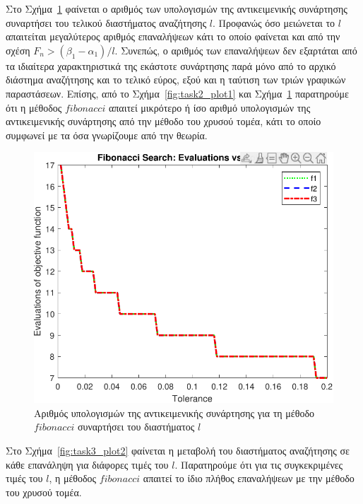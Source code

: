 \documentclass{article}
\begin{document}
Στο Σχήμα~\ref{fig:task3_plot1} φαίνεται ο αριθμός των υπολογισμών της αντικειμενικής συνάρτησης συναρτήσει
του τελικού διαστήματος αναζήτησης $l$. Προφανώς όσο μειώνεται το $l$ απαιτείται μεγαλύτερος αριθμός 
επαναλήψεων κάτι το οποίο φαίνεται και από την σχέση $F_n > (\beta_1 - \alpha_1) / l$. Συνεπώς,
ο αριθμός των επαναλήψεων δεν εξαρτάται από τα ιδιαίτερα χαρακτηριστικά της εκάστοτε συνάρτησης παρά
μόνο από το αρχικό διάστημα αναζήτησης και το τελικό εύρος, εξού και η ταύτιση των τριών γραφικών παραστάσεων.
Επίσης, από το Σχήμα~\ref{fig:task2_plot1} και Σχήμα~\ref{fig:task3_plot1} παρατηρούμε ότι η μέθοδος $fibonacci$
απαιτεί μικρότερο ή ίσο αριθμό υπολογισμών της αντικειμενικής συνάρτησης από την μέθοδο του χρυσού τομέα, κάτι το οποίο
συμφωνεί με τα όσα γνωρίζουμε από την θεωρία.

\begin{figure}
    \centering
    \includegraphics[width=0.75\linewidth]{plots/task3_plot1.pdf}
    \caption{Αριθμός υπολογισμών της αντικειμενικής συνάρτησης για τη μέθοδο $fibonacci$ συναρτήσει του διαστήματος $l$}
    \label{fig:task3_plot1}
\end{figure}

Στο Σχήμα~\ref{fig:task3_plot2} φαίνεται η μεταβολή του διαστήματος αναζήτησης σε κάθε επανάληψη για διάφορες τιμές
του $l$. Παρατηρούμε ότι για τις συγκεκριμένες τιμές του $l$, η μέθοδος $fibonacci$ απαιτεί το ίδιο πλήθος 
επαναλήψεων με την μέθοδο του χρυσού τομέα.
\end{document}
